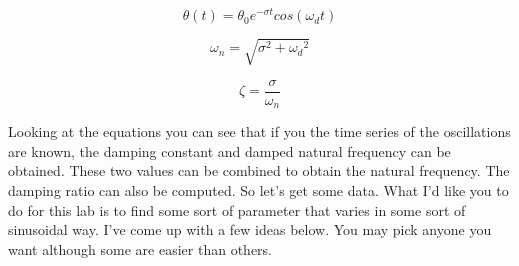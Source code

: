 \begin{equation}
\theta(t) = \theta_0e^{-\sigma t}cos(\omega_d t)
\end{equation}

\begin{equation}
\omega_n = \sqrt{\sigma^2 + {\omega_d}^2}
\end{equation}

\begin{equation}
\zeta = \frac{\sigma}{\omega_n}
\end{equation}

Looking at the equations you can see that if you the time series of the oscillations are known, the damping constant and damped natural frequency can be obtained. These two values can be combined to obtain the natural frequency. The damping ratio can also be computed. So let’s get some data. What I’d like you to do for this lab is to find some sort of parameter that varies in some sort of sinusoidal way. I’ve come up with a few ideas below. You may pick anyone you want although some are easier than others.

